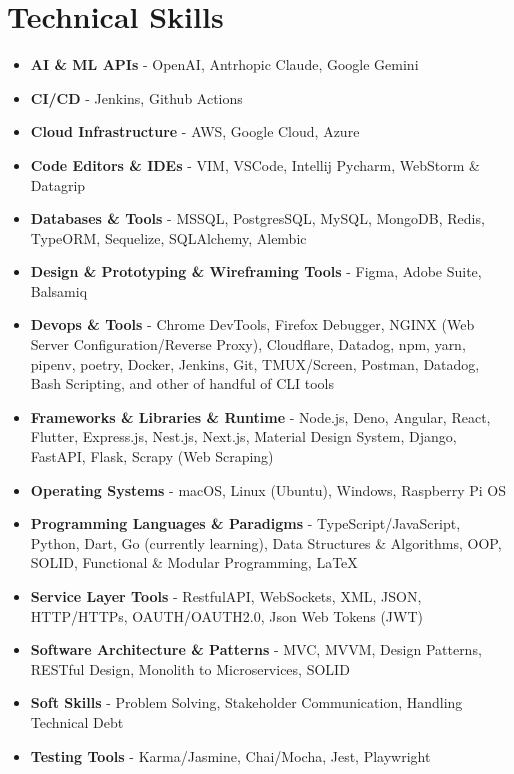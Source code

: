 \section{Technical Skills}
{
	\normalsize
	\begin{itemize}[topsep=0pt, partopsep=0pt, itemsep=0pt, parsep=0pt]
		\item \textbf{AI \& ML APIs} - OpenAI, Antrhopic Claude, Google Gemini
		\item \textbf{CI/CD} - Jenkins, Github Actions
		\item \textbf{Cloud Infrastructure} - AWS, Google Cloud, Azure
		\item \textbf{Code Editors \& IDEs} - VIM, VSCode, Intellij Pycharm, WebStorm \& Datagrip
		\item \textbf{Databases \& Tools} - MSSQL, PostgresSQL, MySQL, MongoDB, Redis, TypeORM, Sequelize, SQLAlchemy, Alembic
		\item \textbf{Design \& Prototyping \& Wireframing Tools} - Figma, Adobe Suite, Balsamiq
		\item \textbf{Devops \& Tools} - Chrome DevTools, Firefox Debugger, NGINX (Web Server Configuration/Reverse Proxy), Cloudflare, Datadog, npm, yarn, pipenv, poetry, Docker, Jenkins, Git, TMUX/Screen, Postman, Datadog, Bash Scripting, and other of handful of CLI tools
		\item \textbf{Frameworks \& Libraries \& Runtime} - Node.js, Deno, Angular, React, Flutter, Express.js, Nest.js, Next.js, Material Design System, Django, FastAPI, Flask, Scrapy (Web Scraping)
		\item \textbf{Operating Systems} - macOS, Linux (Ubuntu), Windows, Raspberry Pi OS
		\item \textbf{Programming Languages \& Paradigms} - TypeScript/JavaScript, Python, Dart, Go (currently learning), Data Structures \& Algorithms, OOP, SOLID, Functional \& Modular Programming, LaTeX
		\item \textbf{Service Layer Tools} - RestfulAPI, WebSockets, XML, JSON, HTTP/HTTPs, OAUTH/OAUTH2.0, Json Web Tokens (JWT)
		\item \textbf{Software Architecture \& Patterns} - MVC, MVVM, Design Patterns, RESTful Design, Monolith to Microservices, SOLID
		\item \textbf{Soft Skills} - Problem Solving, Stakeholder Communication, Handling Technical Debt
		\item \textbf{Testing Tools} - Karma/Jasmine, Chai/Mocha, Jest, Playwright
	\end{itemize}
}
